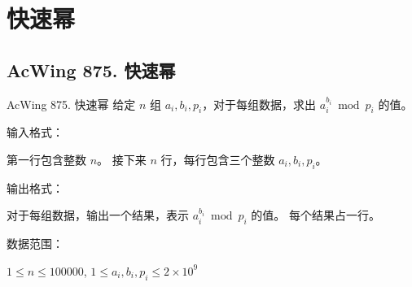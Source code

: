 \section{快速幂}

\subsection{AcWing 875. 快速幂}
\begin{titledbox}{AcWing 875. 快速幂}
    给定 $n$ 组 $a_i, b_i, p_i$，对于每组数据，求出 $a_i ^ {b_i} \bmod p_i$ 的值。

    输入格式：

    第一行包含整数 $n$。 接下来 $n$ 行，每行包含三个整数 $a_i, b_i, p_i$。

    输出格式：

    对于每组数据，输出一个结果，表示 $a_i ^ {b_i} \bmod p_i$ 的值。 每个结果占一行。

    数据范围：

    $1 \le n \le 100000$, $1 \le a_i,b_i,p_i \le 2 \times 10^9$

    \begin{inputblock}
         \\
         \\
    \end{inputblock}
    \begin{outputblock}
         \\
    \end{outputblock}
\end{titledbox}

